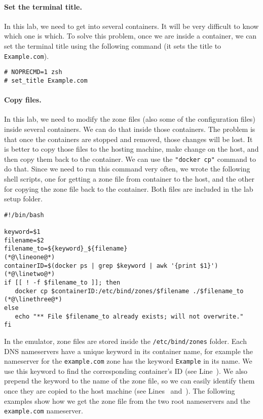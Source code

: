 \paragraph{Set the terminal title.} In this lab,
we need to get into several containers. It will be very difficult 
to know which one is which. To solve this problem, once we 
are inside a container, we can set the terminal title using the 
following command (it sets the title to \texttt{Example.com}). 

\begin{lstlisting}
# NOPRECMD=1 zsh
# set_title Example.com
\end{lstlisting}
 

\paragraph{Copy files.} In this lab, we need to modify the zone files (also
some of the configuration files) inside several containers. We can do that
inside those containers. The problem is that once the containers are stopped
and removed, those changes will be lost. It is better to copy those files
to the hosting machine, make change on the host, and then copy them 
back to the container.  We can use the \texttt{"docker cp"} command
to do that. Since we need to run this command very often, we wrote 
the following shell scripts, one for getting a zone file from container
to the host, and the other for copying the zone file back 
to the container. Both files are included in the lab setup folder.

\begin{lstlisting}[caption=Getting the zone file from container: \texttt{getzone.sh}]
#!/bin/bash

keyword=$1
filename=$2
filename_to=${keyword}_${filename}                                  (*@\lineone@*)
containerID=$(docker ps | grep $keyword | awk '{print $1}')         (*@\linetwo@*) 
if [[ ! -f $filename_to ]]; then
   docker cp $containerID:/etc/bind/zones/$filename ./$filename_to  (*@\linethree@*) 
else
   echo "** File $filename_to already exists; will not overwrite."
fi
\end{lstlisting}

In the emulator, zone files are stored inside the \texttt{/etc/bind/zones} folder.  
Each DNS nameservers have a unique keyword in its container name, for example
the nameserver for the \texttt{example.com} zone has the keyword \texttt{Example}
in its name. We use this keyword to find the corresponding container's ID (see
Line~\linetwo). We also prepend the keyword to the name of the zone file, so we can
easily identify them once they are copied to the host machine (see Lines~\lineone
and~\linethree). The following examples show how we get the zone file from
the two root nameservers and the \texttt{example.com} nameserver.  



